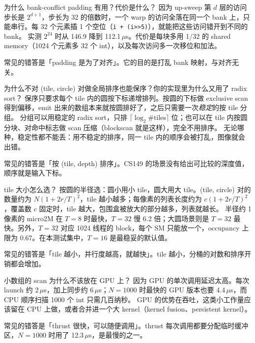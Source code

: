\documentclass[11pt,a4paper]{ctexart}
\begin{document}
\begin{iqbox}{为什么 bank-conflict padding 有用？代价是什么？}
因为 up-sweep 第 $d$ 层的访问步长是 $2^{d+1}$，步长为 32 的倍数时，一个 warp 的访问全落在同一个 bank 上，只能串行。每 32 个元素插 1 个空位（\texttt{i + (i>>5)}），就能把这些访问错开到不同的 bank。
实测 $2^{24}$ 时从 146.9 降到 112.1\,$\mu$s。代价是每块多用 1/32 的 shared memory（1024 个元素多 32 个 int），以及每次访问多一次移位和加法。
\par 常见的错答是「padding 是为了对齐」。它的目的是打乱 bank 映射，与对齐无关。
\end{iqbox}

\begin{iqbox}{为什么不对 (tile, circle) 对做全局排序也能保序？你的实现里为什么又用了 radix sort？}
保序只要求每个 tile 内的圆按下标递增排列。按圆的下标做 exclusive scan 得到偏移，emit 出来的数组本来就按圆排好了，之后只需要一次\emph{稳定}的按 tile 分组。
分组可以用稳定的 radix sort，只排 $\lceil\log_2\#\text{tiles}\rceil$ 位；也可以在 tile 内按圆分块、对命中标志做 scan 压缩（blockscan 就是这样），完全不用排序。
无论哪种，稳定性都不能丢：用不稳定的排序，同一 tile 内的顺序会被打乱，图像就会出错。
\par 常见的错答是「按 (tile, depth) 排序」。CS149 的场景没有给出可比较的深度值，顺序就是输入下标。
\end{iqbox}

\begin{iqbox}{tile 大小怎么选？}
按圆的半径选：圆小用小 tile，圆大用大 tile。(tile, circle) 对的数量约为 $N(1+2r/T)^2$，tile 越小越多；每像素的列表长度约为 $c(1+2r/T)^2$，覆盖数 $c$ 固定时，tile 越大，包围盒被放大的部分越多，列表就越长。
半径约 1 像素的 micro2M 在 $T=8$ 时最快，$T=32$ 慢 6.2 倍；大圆场景则是 $T=32$ 最快。另外，$T=32$ 对应 1024 线程的 block，每个 SM 只能放一个，occupancy 上限为 0.67。在本测试集中，$T=16$ 是最稳妥的默认值。
\par 常见的错答是「tile 越小，并行度越高，就越快」。tile 越小，分桶的对数和排序开销都会增加。
\end{iqbox}

\begin{iqbox}{小数组的 scan 为什么不该放在 GPU 上？}
因为 GPU 的单次调用延迟太高。每次 launch 约 2\,$\mu$s，加上同步约 6\,$\mu$s；$N=1000$ 时最快的 GPU 版本也要 4.4\,$\mu$s，而 CPU 顺序扫描 1000 个 int 只需几百纳秒。
GPU 的优势在吞吐，这类小工作量应该留在 CPU 上做，或者合并进一个大 kernel（kernel fusion、persistent kernel）。
\par 常见的错答是「thrust 很快，可以随便调用」。thrust 每次调用都要分配临时缓冲区，$N=1000$ 时用了 12.3\,$\mu$s，是最慢的之一。
\end{iqbox}
\end{document}
